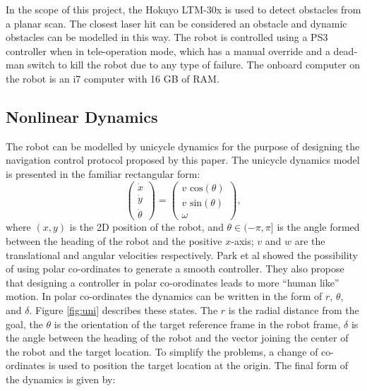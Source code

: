 \documentclass[journal]{IEEEtran}
\begin{document}
In the scope of this project, the Hokuyo LTM-30x is used to detect obstacles from a planar scan. The closest laser hit can be considered an obstacle and dynamic obstacles can be modelled in this way. The robot is controlled using a PS3 controller when in tele-operation mode, which has a manual override and a dead-man switch to kill the robot due to any type of failure. The onboard computer on the robot is an i7 computer with 16 GB of RAM.

\subsection{Nonlinear Dynamics}

The robot can be modelled by unicycle dynamics for the purpose of designing the navigation control protocol proposed by this paper. The unicycle dynamics model is presented in the familiar rectangular form:
\begin{equation}
\left(
\begin{matrix}
\dot{x}\\
\dot{y}\\
\dot{\theta}
\end{matrix}
\right)
=
\left(
\begin{matrix}
v \text{ cos}(\theta)\\
v \text{ sin}(\theta)\\
\omega
\end{matrix}
\right),
\end{equation}
where $(x,y)$ is the 2D position of the robot, and $\theta \in (-\pi ,\pi]$ is the angle formed between the heading of the robot and the positive $x$-axis; $v$ and $w$ are the translational and angular velocities respectively. Park et al \cite{park2011} showed the possibility of using polar co-ordinates to generate a smooth controller. They also propose that designing a controller in polar co-orodinates leads to more ``human like'' motion. 
In polar co-ordinates the dynamics can be written in the form of $r$, $\theta$, and $\delta$. Figure \ref{fig:uni} describes these states. The $r$ is the radial distance from the goal, the $\theta$ is the orientation of the target reference frame in the robot frame, $\delta$ is the angle between the heading of the robot and the vector joining the center of the robot and the target location. To simplify the problems, a change of co-ordinates is used to position the target location at the origin. The final form of the dynamics is given by:  
\end{document}
